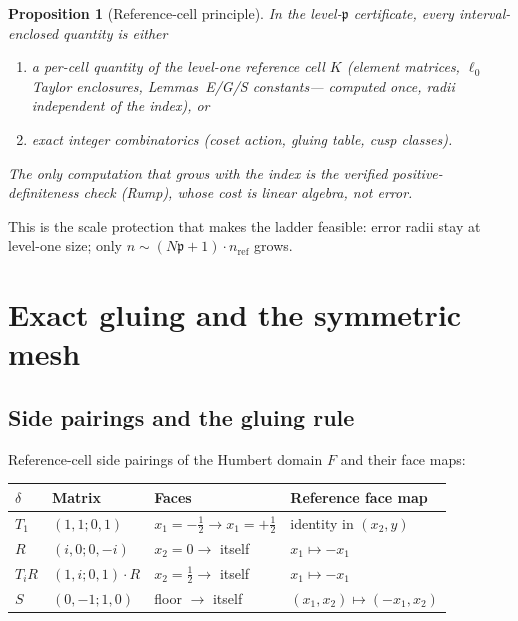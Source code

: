 \documentclass[11pt]{amsart}
\newtheorem{proposition}[theorem]{Proposition}
\newcommand{\p}{\mathfrak{p}}
\begin{document}
\begin{proposition}[Reference-cell principle]\label{prop:RCP}
In the level-$\p$ certificate, every interval-enclosed quantity is either
\begin{enumerate}
\item[(a)] a per-cell quantity of the level-one reference cell $K$
  (element matrices, $\ell_0$ Taylor enclosures, Lemmas~E/G/S constants---
  computed once, radii independent of the index), or
\item[(b)] exact integer combinatorics (coset action, gluing table, cusp
  classes).
\end{enumerate}
The only computation that grows with the index is the verified
positive-definiteness check (Rump), whose cost is linear algebra, not
error.
\end{proposition}

This is the scale protection that makes the ladder feasible: error
radii stay at level-one size; only $n\sim(N\p+1)\cdot n_{\mathrm{ref}}$
grows.

\section{Exact gluing and the symmetric mesh}\label{sec:glue}

\subsection{Side pairings and the gluing rule}

Reference-cell side pairings of the Humbert domain $F$ and their face
maps:

\begin{center}
\begin{tabular}{@{}llll@{}}
\toprule
$\delta$ & Matrix & Faces & Reference face map \\
\midrule
$T_1$ & $(1,1;0,1)$ & $x_1=-\tfrac12\to x_1=+\tfrac12$
  & identity in $(x_2,y)$ \\
$R$ & $(i,0;0,-i)$ & $x_2=0\to$ itself & $x_1\mapsto -x_1$ \\
$T_i R$ & $(1,i;0,1)\cdot R$ & $x_2=\tfrac12\to$ itself
  & $x_1\mapsto -x_1$ \\
$S$ & $(0,-1;1,0)$ & floor $\to$ itself & $(x_1,x_2)\mapsto(-x_1,x_2)$ \\
\bottomrule
\end{tabular}
\end{center}
\end{document}
